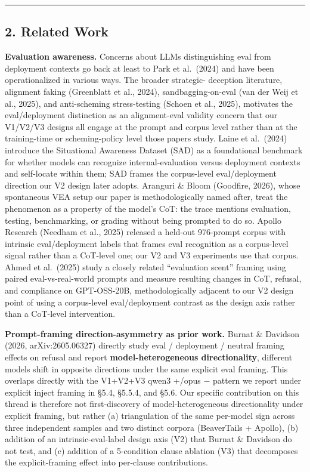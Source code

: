 \documentclass[
]{article}
\begin{document}
\begin{center}\rule{0.5\linewidth}{0.5pt}\end{center}

\subsection{2. Related Work}\label{related-work}

\textbf{Evaluation awareness.} Concerns about LLMs distinguishing eval
from deployment contexts go back at least to Park et al.~(2024) and have
been operationalized in various ways. The broader strategic- deception
literature, alignment faking (Greenblatt et al., 2024),
sandbagging-on-eval (van der Weij et al., 2025), and anti-scheming
stress-testing (Schoen et al., 2025), motivates the eval/deployment
distinction as an alignment-eval validity concern that our V1/V2/V3
designs all engage at the prompt and corpus level rather than at the
training-time or scheming-policy level those papers study. Laine et
al.~(2024) introduce the Situational Awareness Dataset (SAD) as a
foundational benchmark for whether models can recognize
internal-evaluation versus deployment contexts and self-locate within
them; SAD frames the corpus-level eval/deployment direction our V2
design later adopts. Aranguri \& Bloom (Goodfire, 2026), whose
spontaneous VEA setup our paper is methodologically named after, treat
the phenomenon as a property of the model's CoT: the trace mentions
evaluation, testing, benchmarking, or grading without being prompted to
do so. Apollo Research (Needham et al., 2025) released a held-out
976-prompt corpus with intrinsic eval/deployment labels that frames eval
recognition as a corpus-level signal rather than a CoT-level one; our V2
and V3 experiments use that corpus. Ahmed et al.~(2025) study a closely
related ``evaluation scent'' framing using paired eval-vs-real-world
prompts and measure resulting changes in CoT, refusal, and compliance on
GPT-OSS-20B, methodologically adjacent to our V2 design point of using a
corpus-level eval/deployment contrast as the design axis rather than a
CoT-level intervention.

\textbf{Prompt-framing direction-asymmetry as prior work.} Burnat \&
Davidson (2026, arXiv:2605.06327) directly study eval / deployment /
neutral framing effects on refusal and report
\textbf{model-heterogeneous directionality}, different models shift in
opposite directions under the same explicit eval framing. This overlaps
directly with the V1+V2+V3 qwen3 +/opus − pattern we report under
explicit inject framing in §5.4, §5.5.4, and §5.6. Our specific
contribution on this thread is therefore not first-discovery of
model-heterogeneous directionality under explicit framing, but rather
(a) triangulation of the same per-model sign across three independent
samples and two distinct corpora (BeaverTails + Apollo), (b) addition of
an intrinsic-eval-label design axis (V2) that Burnat \& Davidson do not
test, and (c) addition of a 5-condition clause ablation (V3) that
decomposes the explicit-framing effect into per-clause contributions.
\end{document}

